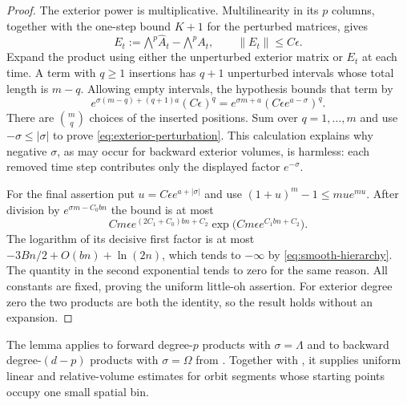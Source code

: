 \begin{proof}
The exterior power is multiplicative.  Multilinearity in its $p$
columns, together with the one-step bound $K+1$ for the perturbed
matrices, gives
\[
 E_t:=\mathord{\bigwedge}^p\widehat A_t
             -\mathord{\bigwedge}^p A_t,
 \qquad \|E_t\|\leq C\epsilon.
\]
Expand the product using either the unperturbed exterior matrix or
$E_t$ at each time.  A term with $q\geq1$ insertions has $q+1$
unperturbed intervals whose total length is $m-q$.
Allowing empty intervals, the hypothesis bounds that term by
\[
 e^{\sigma(m-q)+(q+1)a}(C\epsilon)^q
 =e^{\sigma m+a}(C\epsilon e^{a-\sigma})^q.
\]
There are $\binom mq$ choices of the inserted positions.
Sum over $q=1,\ldots,m$ and use $-\sigma\leq|\sigma|$ to prove
\eqref{eq:exterior-perturbation}.  This calculation explains why
negative $\sigma$, as may occur for backward exterior volumes, is
harmless: each removed time step contributes only the displayed
factor $e^{-\sigma}$.

For the final assertion put
$u=C\epsilon e^{a+|\sigma|}$ and use
$(1+u)^m-1\leq mu e^{mu}$.
After division by $e^{\sigma m-C_0bn}$ the bound is at most
\[
 C m\epsilon e^{(2C_1+C_0)bn+C_2}
       \exp\!\bigl(Cm\epsilon e^{C_1bn+C_2}\bigr).
\]
The logarithm of its decisive first factor is at most
$-3Bn/2+O(bn)+\ln(2n)$, which tends to $-\infty$ by
\eqref{eq:smooth-hierarchy}.  The quantity in the second exponential
tends to zero for the same reason.
All constants are fixed, proving the uniform little-oh assertion.
For exterior degree zero the two products are both the identity, so
the result holds without an expansion.
\end{proof}

The lemma applies to forward degree-$p$ products with
$\sigma=\Lambda$ and to backward degree-$(d-p)$ products with
$\sigma=\Omega$ from .
Together with , it supplies uniform linear
and relative-volume estimates for orbit segments whose starting
points occupy one small spatial bin.
